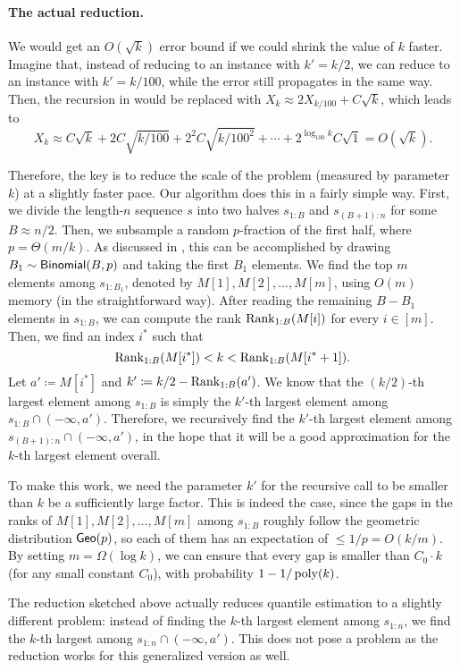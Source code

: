 \paragraph{The actual reduction.} We would get an $O(\sqrt{k})$ error bound if we could shrink the value of $k$ faster. Imagine that, instead of reducing to an instance with $k' = k/2$, we can reduce to an instance with $k' = k / 100$, while the error still propagates in the same way. Then, the recursion in  would be replaced with $X_k \approx 2X_{k/100} + C\sqrt{k}$, which leads to
\[
    X_k \approx C\sqrt{k} + 2C\sqrt{k/100} + 2^2 C\sqrt{k/100^2} + \cdots + 2^{\log_{100} k}C\sqrt{1}
=   O(\sqrt{k}).
\]

Therefore, the key is to reduce the scale of the problem (measured by parameter $k$) at a slightly faster pace. Our algorithm does this in a fairly simple way. First, we divide the length-$n$ sequence $s$ into two halves $s_{1:B}$ and $s_{(B+1):n}$ for some $B \approx n / 2$. Then, we subsample a random $p$-fraction of the first half, where $p = \Theta(m/k)$. As discussed in , this can be accomplished by drawing $B_1 \sim \mathsf{Binomial}(B, p)$ and taking the first $B_1$ elements. We find the top $m$ elements among $s_{1:B_1}$, denoted by $M[1], M[2], \ldots, M[m]$, using $O(m)$ memory (in the straightforward way). After reading the remaining $B - B_1$ elements in $s_{1:B}$, we can compute the rank $\mathrm{Rank}_{1:B}(M[i])$ for every $i \in [m]$. Then, we find an index $i^*$ such that
\[
    \mathrm{Rank}_{1:B}(M[i^*])
<   k
<   \mathrm{Rank}_{1:B}(M[i^* + 1]).
\]
Let $a' \coloneqq M[i^*]$ and $k' \coloneqq k/2 - \mathrm{Rank}_{1:B}(a')$. We know that the $(k/2)$-th largest element among $s_{1:B}$ is simply the $k'$-th largest element among $s_{1:B} \cap (-\infty, a')$. Therefore, we recursively find the $k'$-th largest element among $s_{(B+1):n} \cap (-\infty, a')$, in the hope that it will be a good approximation for the $k$-th largest element overall.

To make this work, we need the parameter $k'$ for the recursive call to be smaller than $k$ be a sufficiently large factor. This is indeed the case, since the gaps in the ranks of $M[1], M[2], \ldots, M[m]$ among $s_{1:B}$ roughly follow the geometric distribution $\mathsf{Geo}(p)$, so each of them has an expectation of $\le 1/p = O(k/m)$. By setting $m = \Omega(\log k)$, we can ensure that every gap is smaller than $C_0 \cdot k$ (for any small constant $C_0$), with probability $1 - 1/\operatorname*{poly}(k)$.

The reduction sketched above actually reduces quantile estimation to a slightly different problem: instead of finding the $k$-th largest element among $s_{1:n}$, we find the $k$-th largest among $s_{1:n} \cap (-\infty, a')$. This does not pose a problem as the reduction works for this generalized version as well.

